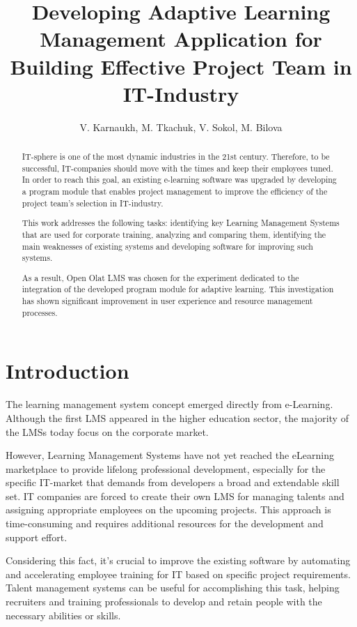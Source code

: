 \documentclass[a4paper,14pt,oneside,final]{extarticle}
\title{Developing Adaptive Learning Management Application for Building Effective Project Team in IT-Industry}
\author{V. Karnaukh, M. Tkachuk, V. Sokol, M. Bilova}
\begin{document}
\maketitle

\begin{abstract}
IT-sphere is one of the most dynamic industries in the 21st century.  Therefore, to be successful, IT-companies should move with the times and keep their employees tuned. In order to reach this goal, an existing e-learning software was upgraded by developing a program module that enables project management to improve the efficiency of the project team’s selection in IT-industry. 

This work addresses the following tasks: identifying key Learning Management Systems that are used for corporate training, analyzing and comparing them, identifying the main weaknesses of existing systems and developing software for improving such systems. 

As a result, Open Olat LMS was chosen for the experiment dedicated to the integration of the developed program module for adaptive learning. This investigation has shown significant improvement in user experience and resource management processes. 
\end{abstract}

\section{Introduction}
The learning  management system concept emerged directly from e-Learning. Although the first LMS appeared in the higher education sector, the majority of the LMSs today focus on the corporate market. 

However, Learning Management Systems have not yet reached the eLearning marketplace to provide lifelong professional development, especially for the specific IT-market that demands from developers a broad and extendable skill set. IT companies are forced to create their own LMS for managing talents and assigning appropriate employees on the upcoming projects. This approach is time-consuming and requires additional resources for the development and support effort. 

Considering this fact, it’s crucial to improve the existing software by automating and accelerating employee training for IT based on specific project requirements. Talent management systems can be useful for accomplishing this task, helping recruiters and training professionals to develop and retain people with the necessary abilities or skills. 
\end{document}
